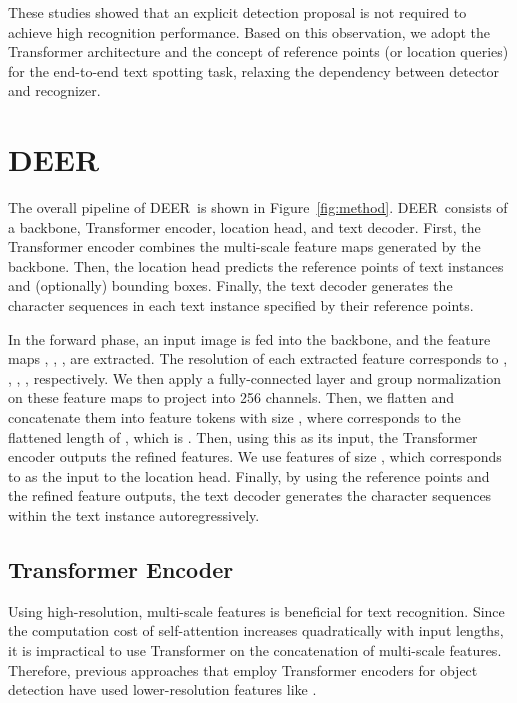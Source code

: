 \documentclass[10pt,twocolumn,letterpaper]{article}
\newcommand{\Figure}[1]{Figure~\ref{fig:#1}}
\newcommand{\methodname}[0]{DEER}
\begin{document}
These studies showed that an explicit detection proposal is not required to achieve high recognition performance.
Based on this observation, we adopt the Transformer architecture and the concept of reference points (or location queries) for the end-to-end text spotting task, relaxing the dependency between detector and recognizer.
 
\section{DEER}








The overall pipeline of \methodname~is shown in \Figure{method}. \methodname~consists of a backbone, Transformer encoder, location head, and text decoder. First, the Transformer encoder combines the multi-scale feature maps generated by the backbone. Then, the location head predicts the reference points of text instances and (optionally) bounding boxes. Finally, the text decoder generates the character sequences in each text instance specified by their reference points. 

In the forward phase, an input image  is fed into the backbone, and the feature maps , , ,  are extracted. The resolution of each extracted feature corresponds to , , , , respectively. We then apply a fully-connected layer and group normalization~\cite{wu2018gn} on these feature maps to project into 256 channels. Then, we flatten and concatenate them into feature tokens with size , where  corresponds to the flattened length of , which is . Then, using this as its input, the Transformer encoder outputs the refined features. We use features of size , which corresponds to  as the input to the location head. Finally, by using the reference points and the refined feature outputs, the text decoder generates the character sequences within the text instance autoregressively.






\subsection{Transformer Encoder}

Using high-resolution, multi-scale features is beneficial for text recognition. Since the computation cost of self-attention increases quadratically with input lengths, it is impractical to use Transformer on the concatenation of multi-scale features.  Therefore, previous approaches that employ Transformer encoders for object detection have used lower-resolution features like .
\end{document}
